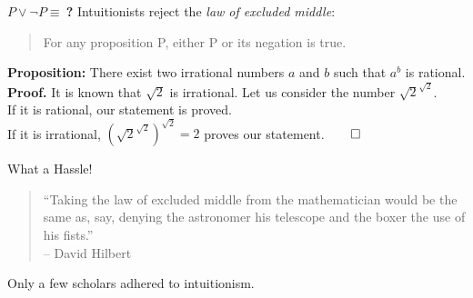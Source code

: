 \documentclass{beamer}
\begin{document}
\begin{frame}{$P\lor\lnot P\equiv\ $\textbf{?}}
Intuitionists reject the \emph{law of excluded middle}:
\begin{quote}
	For any proposition P, either P or its negation is true.
\end{quote}
	\pause
	\textbf{Proposition:} There exist two irrational numbers $a$ and $b$ such that $a^b$ is rational.\\\pause
	\vspace{\baselineskip}
	\textbf{Proof.} It is known that $\sqrt{2}$ is irrational. Let us consider the number $\sqrt{2}^{\sqrt{2}}$.\pause$ $\\ If it is rational, our statement is proved.\pause$ $\\ If it is irrational, $(\sqrt{2}^{\sqrt{2}})^{\sqrt{2}}=2$ proves our statement.\hfill$\qed$
\end{frame}
\begin{frame}{What a Hassle!}
\begin{quote}
``Taking the law of excluded middle from the mathematician would be the same as, say, denying the astronomer his telescope and the boxer the use of his fists.''\nocite{hilbert_tertium_non_datur}\\\hfill-- David Hilbert
\end{quote}
\pause
\centerline{\alert{Only a few scholars adhered to intuitionism.}}
\end{frame}
\end{document}
